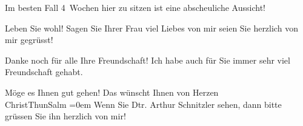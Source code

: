 \pstart
           Im besten Fall 4 Wochen hier zu sitzen ist eine abscheuliche Aussicht!\pend
           
\pstart
           Leben Sie wohl! Sagen Sie Ihrer Frau viel Liebes von mir {\kaufmannsund} seien Sie herzlich
               von mir gegrüsst!\pend
           
\pstart
           {\pb}Danke noch für alle Ihre
               Freundschaft! Ich habe auch für Sie immer sehr viel Freundschaft gehabt.\pend
           
\pstart
           Möge es Ihnen gut gehen! Das wünscht Ihnen von Herzen{\\[\baselineskip]}\spacefill\mbox{ChristThunSalm}\pend
           \leftskip=0em{}
\pstart
           \noindent{}Wenn Sie Dtr. Arthur Schnitzler sehen, dann bitte grüssen Sie ihn herzlich von
                  mir!\pend
           \endnumbering{}  \newcommand{\dateiname}{L01678}\newcommand{\titel}{Hugo von Hofmannsthal an Arthur Schnitzler mit Beilage Christiane Thun an Hofmannsthal, [25. 5. 1907]}\newcommand{\editorInnen}{Martin Anton Müller und Gerd-Hermann Susen}
